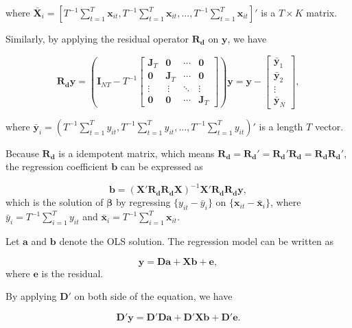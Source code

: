 \documentclass[
]{article}
\begin{document}
where
\(\bar{\boldsymbol{X}}_i = [T^{-1}\sum_{t=1}^{T}\boldsymbol{x}_{it}, T^{-1}\sum_{t=1}^{T}\boldsymbol{x}_{it}, ..., T^{-1}\sum_{t=1}^{T}\boldsymbol{x}_{it}]'\)
is a \(T \times K\) matrix.

Similarly, by applying the residual operator \(\boldsymbol{R_d}\) on
\(\boldsymbol{y}\), we have

\[\boldsymbol{R_dy} = \left(\boldsymbol{I}_{NT} - T^{-1}\begin{bmatrix}\boldsymbol{J}_T & \boldsymbol{0} & \cdots & \boldsymbol{0} \\ \boldsymbol{0} & \boldsymbol{J}_T & \cdots & \boldsymbol{0} \\ \vdots &\ \vdots & \ddots & \vdots \\ \boldsymbol{0} & \boldsymbol{0} & \cdots & \boldsymbol{J}_T\end{bmatrix}\right)\boldsymbol{y} = \boldsymbol{y}-\begin{bmatrix}\bar{\boldsymbol{y}}_1 \\ \bar{\boldsymbol{y}}_2 \\  \vdots \\ \bar{\boldsymbol{y}}_N \end{bmatrix},\]

where
\(\bar{\boldsymbol{y}}_i=(T^{-1}\sum_{t=1}^{T}y_{it}, T^{-1}\sum_{t=1}^{T}y_{it}, ..., T^{-1}\sum_{t=1}^{T}y_{it})'\)
is a length \(T\) vector.

Because \(\boldsymbol{R_d}\) is a idempotent matrix, which means
\(\boldsymbol{R_d} = \boldsymbol{R_d}' = \boldsymbol{R_d}'\boldsymbol{R_d} = \boldsymbol{R_d}\boldsymbol{R_d}'\),
the regression coefficient \(\boldsymbol{b}\) can be expressed as

\[\boldsymbol{b} = (\boldsymbol{X'R_dR_dX})^{-1}\boldsymbol{X'R_dR_dy},\]
which is the solution of \(\boldsymbol{\beta}\) by regressing
\(\{y_{it}-\bar{y}_i\}\) on
\(\{\boldsymbol{x}_{it}-\bar{\boldsymbol{x}}_i\}\), where
\(\bar{y}_i = T^{-1}\sum_{i=1}^{T}y_{it}\) and
\(\bar{\boldsymbol{x}}_{i} = T^{-1}\sum_{i=1}^{T}\boldsymbol{x}_{it}\).

Let \(\boldsymbol{a}\) and \(\boldsymbol{b}\) denote the OLS solution.
The regression model can be written as

\[\boldsymbol{y} = \boldsymbol{Da}+\boldsymbol{Xb}+\boldsymbol{e},\]
where \(\boldsymbol{e}\) is the residual.

By applying \(\boldsymbol{D}'\) on both side of the equation, we have

\[\boldsymbol{D}'\boldsymbol{y}=\boldsymbol{D'Da}+\boldsymbol{D'Xb}+\boldsymbol{D'e}.\]
\end{document}
